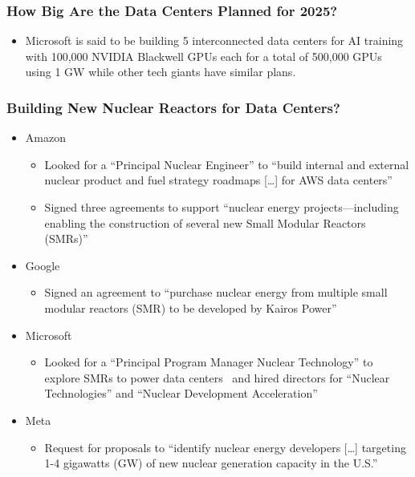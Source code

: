 \documentclass[aspectratio=169]{beamer}
\begin{document}
    \begin{frame}
        \frametitle{How Big Are the Data Centers Planned for 2025?}
        \begin{itemize}
            \item Microsoft is said to be building 5 interconnected data centers for AI training with 100,000 NVIDIA Blackwell GPUs each for a total of 500,000 GPUs using 1 GW while other tech giants have similar plans.~\parencite{patel_10b_2024}
        \end{itemize}
    \end{frame}
    \begin{frame}
        \frametitle{Building New Nuclear Reactors for Data Centers?}
        \begin{itemize}
            \item Amazon
            \begin{itemize}
                \item Looked for a ``Principal Nuclear Engineer'' to ``build internal and external nuclear product and fuel strategy roadmaps [\ldots] for AWS data centers''~\parencite{amazon_principal_2024}
                \item Signed three agreements to support ``nuclear energy projects—including enabling the construction of several new Small Modular Reactors (SMRs)''~\parencite{amazon_nuclear_deals_2024}
            \end{itemize}
            \item Google
            \begin{itemize}
                \item Signed an agreement to ``purchase nuclear energy from multiple small modular reactors (SMR) to be developed by Kairos Power''~\parencite{google_kairos_2024}
            \end{itemize}
            \item Microsoft
            \begin{itemize}
                \item Looked for a ``Principal Program Manager Nuclear Technology'' to explore SMRs to power data centers~\parencite{microsoft_principal_2023} and hired directors for ``Nuclear Technologies'' and ``Nuclear Development Acceleration''~\parencite{data_center_dynamics_microsoft_2024}
            \end{itemize}
            \item Meta
            \begin{itemize}
                \item Request for proposals to ``identify nuclear energy developers [\ldots] targeting 1-4 gigawatts (GW) of new nuclear generation capacity in the U.S.''~\parencite{meta_accelerating_2024}
            \end{itemize}
        \end{itemize}
    \end{frame}
\end{document}
